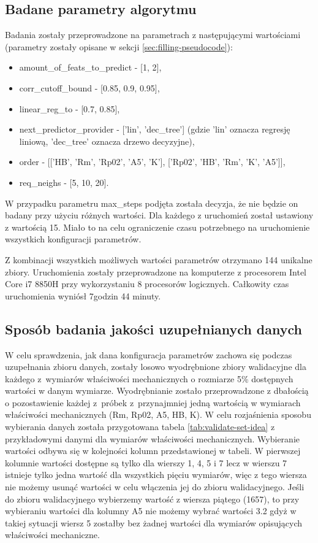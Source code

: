\subsection{Badane parametry algorytmu}
Badania zostały przeprowadzone na parametrach z następującymi wartościami (parametry zostały opisane w sekcji \ref{sec:filling-pseudocode}):
\begin{itemize}
    \item amount\_of\_feats\_to\_predict - [1, 2],
    \item corr\_cutoff\_bound - [0.85, 0.9, 0.95],
    \item linear\_reg\_to - [0.7, 0.85],
    \item next\_predictor\_provider - ['lin', 'dec\_tree'] (gdzie 'lin' oznacza regresję liniową, 'dec\_tree' oznacza drzewo decyzyjne),
    \item order - [['HB', 'Rm', 'Rp02', 'A5', 'K'], ['Rp02', 'HB', 'Rm', 'K', 'A5']],
    \item req\_neighs - [5, 10, 20].
\end{itemize}

W przypadku parametru max\_steps podjęta została decyzja, że nie będzie on badany przy użyciu różnych wartości. Dla każdego z uruchomień został ustawiony z wartością 15. Miało to na celu ograniczenie czasu potrzebnego na uruchomienie wszystkich konfiguracji parametrów.

Z kombinacji wszystkich możliwych wartości parametrów otrzymano 144 unikalne zbiory. Uruchomienia zostały przeprowadzone na komputerze z procesorem Intel Core i7 8850H przy wykorzystaniu 8 procesorów logicznych. Całkowity czas uruchomienia wyniósł 7godzin 44 minuty.

\subsection{Sposób badania jakości uzupełnianych danych}
W celu sprawdzenia, jak dana konfiguracja parametrów zachowa się podczas uzupełnania zbioru danych, zostały losowo wyodrębnione zbiory walidacyjne dla każdego z~wymiarów właściwości mechanicznych o rozmiarze 5\% dostępnych wartości w danym wymiarze. Wyodrębnianie zostało przeprowadzone z dbałością o pozostawienie każdej z~próbek z~przynajmniej jedną wartością w wymiarach właściwości mechanicznych (Rm, Rp02, A5, HB, K). W celu rozjaśnienia sposobu wybierania danych została przygotowana tabela \ref{tab:validate-set-idea} z przykładowymi danymi dla wymiarów właściwości mechanicznych. Wybieranie wartości odbywa się w kolejności kolumn przedstawionej w tabeli. W pierwszej kolumnie wartości dostępne są tylko dla wierszy 1, 4, 5 i 7 lecz w wierszu 7 istnieje tylko jedna wartość dla wszystkich pięciu wymiarów, więc z tego wiersza nie możemy usunąć wartości w celu włączenia jej do zbioru walidacyjnego. Jeśli do zbioru walidacyjnego wybierzemy wartość z wiersza piątego (1657), to przy wybieraniu wartości dla kolumny A5 nie możemy wybrać wartości 3.2 gdyż w takiej sytuacji wiersz 5 zostałby bez żadnej wartości dla wymiarów opisujących właściwości mechaniczne. 



